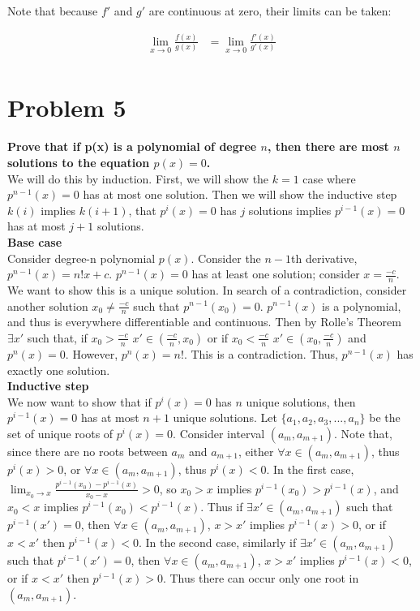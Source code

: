 \documentclass[10pt]{article} %
\begin{document}
Note that because $f'$ and $g'$ are continuous at zero, their limits can be taken:

\begin{align*}
  \lim_{x\rightarrow0}\frac{f(x)}{g(x)} &= \lim_{x\rightarrow0}\frac{f'(x)}{g'(x)}\\
\end{align*}

\section{Problem 5} \textbf{Prove that if p(x) is a polynomial of degree $n$, then there are most $n$ solutions to the equation $p(x) = 0$.}\\
We will do this by induction. First, we will show the $k=1$ case where $p^{n-1}(x) = 0$ has at most one solution. Then we will show the inductive step $k(i)$ implies $k(i+1)$, that $p^{i}(x) = 0$ has $j$ solutions implies $p^{i-1}(x) = 0$ has at most $j+1$ solutions.\\

\textbf{Base case}\\
Consider degree-n polynomial $p(x)$. Consider the $n-1$th derivative, $p^{n-1}(x)=n!x+c$. $p^{n-1}(x)=0$ has at least one solution; consider $x=\frac{-c}{n}$. We want to show this is a unique solution. In search of a contradiction, consider another solution $x_0 \neq \frac{-c}{n}$ such that $p^{n-1}(x_0) = 0$. $p^{n-1}(x)$ is a polynomial, and thus is everywhere differentiable and continuous. Then by Rolle's Theorem $\exists x'$ such that, if $x_0>\frac{-c}{n}$ $x'\in(\frac{-c}{n},x_0)$ or if $x_0<\frac{-c}{n}$ $x'\in(x_0,\frac{-c}{n})$ and $p^{n}(x)=0$. However, $p^{n}(x)=n!$. This is a contradiction. Thus, $p^{n-1}(x)$ has exactly one solution.\\

\textbf{Inductive step}\\
We now want to show that if $p^{i}(x)=0$ has $n$ unique solutions, then $p^{i-1}(x)=0$ has at most $n+1$ unique solutions. Let $\{a_1, a_2, a_3, ..., a_n\}$ be the set of unique roots of $p^i(x)=0$. Consider interval $(a_m, a_{m+1})$. Note that, since there are no roots between $a_m$ and $a_{m+1}$, either $\forall x \in (a_m, a_{m+1})$, thus $p^i(x)>0$, or $\forall x \in (a_m, a_{m+1})$, thus $p^i(x)<0$. In the first case, $\lim_{x_0\rightarrow x} \frac{p^{i-1}(x_0)-p^{i-1}(x)}{x_0-x} > 0$, so $x_0>x$ implies $p^{i-1}(x_0)>p^{i-1}(x)$, and $x_0<x$ implies $p^{i-1}(x_0)<p^{i-1}(x)$. Thus if $\exists x' \in (a_m, a_{m+1})$ such that $p^{i-1}(x')=0$, then $\forall x \in (a_m, a_{m+1})$, $x>x'$ implies $p^{i-1}(x)>0$, or if $x<x'$ then $p^{i-1}(x)<0$. In the second case, similarly if $\exists x' \in (a_m, a_{m+1})$ such that $p^{i-1}(x')=0$, then $\forall x \in (a_m, a_{m+1})$, $x>x'$ implies $p^{i-1}(x)<0$, or if $x<x'$ then $p^{i-1}(x)>0$. Thus there can occur only one root in $(a_m,a_{m+1})$.\\
\end{document}
